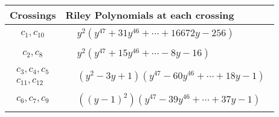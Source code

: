 \documentclass[1p]{elsarticle_modified}
\theoremstyle{definition}
\begin{document}
\begin{tabular}{m{50pt}|m{274pt}}
Crossings & \hspace{64pt}Riley Polynomials at each crossing \\
\hline $$\begin{aligned}c_{1},c_{10}\end{aligned}$$&$\begin{aligned}
&y^2(y^{47}+31 y^{46}+\cdots+16672 y-256)
\end{aligned}$\\
\hline $$\begin{aligned}c_{2},c_{8}\end{aligned}$$&$\begin{aligned}
&y^2(y^{47}+15 y^{46}+\cdots-8 y-16)
\end{aligned}$\\
\hline $$\begin{aligned}c_{3},c_{4},c_{5}\\c_{11},c_{12}\end{aligned}$$&$\begin{aligned}
&(y^2-3 y+1)(y^{47}-60 y^{46}+\cdots+18 y-1)
\end{aligned}$\\
\hline $$\begin{aligned}c_{6},c_{7},c_{9}\end{aligned}$$&$\begin{aligned}
&((y-1)^2)(y^{47}-39 y^{46}+\cdots+37 y-1)
\end{aligned}$\\
\hline
\end{tabular}
\vskip 2pc
\end{document}
